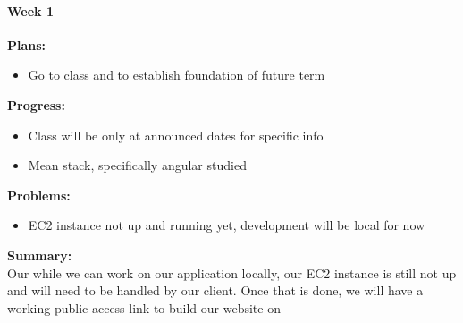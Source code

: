 \paragraph{Week 1}
\begin{adjustwidth}{2.5em}{0pt}
    \vspace{-0.5cm}\textbf{Plans:}
    \vspace{-0.5cm}
    \begin{itemize}
        \item Go to class and to establish foundation of future term 
    \end{itemize} 
    \vspace{-0.3cm}\textbf{Progress:}
    \vspace{-0.5cm}
    \begin{itemize}
        \item Class will be only at announced dates for specific info
		\item Mean stack, specifically angular studied
    \end{itemize} 
    \vspace{-0.3cm}\textbf{Problems:}
    \vspace{-0.5cm}
    \begin{itemize}
        \item EC2 instance not up and running yet, development will be local for now
    \end{itemize}  
    \vspace{-0.3cm}\noindent\textbf{Summary:}\\
    \noindent Our while we can work on our application locally, our EC2 instance is still not up and will need to be handled by our client. Once that is done, we will have a working public access link to build our website on
\end{adjustwidth}
